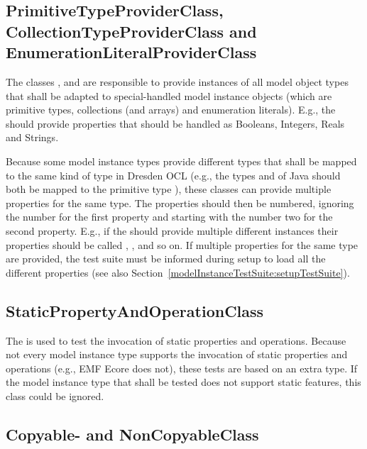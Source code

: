 \subsection{PrimitiveTypeProviderClass, CollectionTypeProviderClass and 
E\-nu\-me\-ra\-tion\-Li\-te\-ral\-ProviderClass}
\label{modelInstanceTestSuite:specialTypeProviderClasses}

The classes , 
 and 
 are responsible to provide 
instances of all model object types that shall be adapted to special-handled 
model instance objects (which are primitive types, collections (and arrays) and
enumeration literals). E.g., the  should 
provide properties that should be handled as Booleans, Integers, Reals and 
Strings.

Because some model instance types provide different types that shall be mapped
to the same kind of type in Dresden OCL (e.g., the types  and
 of Java should both be mapped to the primitive type 
), these classes can provide multiple properties for the same 
type. The properties should then be numbered, ignoring the number for the first 
property and starting with the number two for the second property. E.g., if the 
 should provide multiple 
different  instances their properties should be called 
, ,  and so 
on. If multiple properties for the same type are provided, the test suite must 
be informed during setup to load all the different properties (see also 
Section~\ref{modelInstanceTestSuite:setupTestSuite}).


\subsection{StaticPropertyAndOperationClass}

The  is used to test the invocation of 
static properties and operations. Because not every model instance type supports
the invocation of static properties and operations (e.g., \acs{EMF} Ecore does 
not), these tests are based on an extra type. If the model instance type that
shall be tested does not support static features, this class could be ignored.


\subsection{Copyable- and NonCopyableClass}

